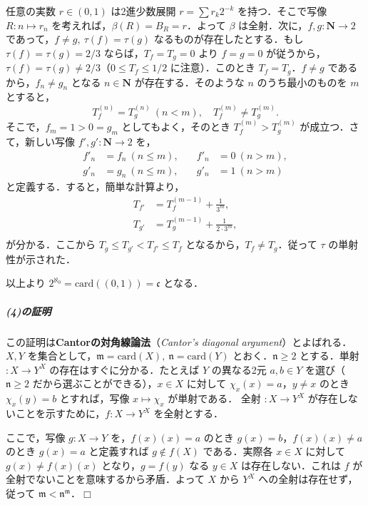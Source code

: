 \documentclass[10pt,b5paper,pandoc]{bxjsarticle}
\let\oldsubparagraph\subparagraph
\renewcommand{\subparagraph}[1]{\oldsubparagraph{#1}\mbox{}}
\def\lt{<}
\def\gt{>}
\begin{document}
任意の実数 \(r \in (0, 1)\) は2進少数展開 \(r = \sum r_k 2^{-k}\)
を持つ．そこで写像 \(R \colon n \mapsto r_n\)
を考えれば，\(\beta(R) = B_R = r\)．よって \(\beta\)
は全射．次に，\(f, g \colon \boldsymbol N \to 2\)
であって，\(f \neq g,\ \tau(f) = \tau(g)\)
なるものが存在したとする．もし \(\tau(f) = \tau(g) = 2/3\)
ならば，\(T_f = T_g = 0\) より \(f = g = 0\)
が従うから，\(\tau(f) = \tau(g) \neq 2/3\)（\(0 \leqslant T_f \leqslant 1/2\)
に注意）．このとき \(T_f = T_g\)．\(f \neq g\)
であるから，\(f_n \neq g_n\) となる \(n \in \boldsymbol N\)
が存在する．そのような \(n\) のうち最小のものを \(m\) とすると， \[
T_f^{(n)} = T_g^{(n)} \ (n \lt m), \quad T_f^{(m)} \neq T_g^{(m)}.
\] そこで，\(f_m = 1 \gt 0 = g_m\) としてもよく，そのとき
\(T_f^{(m)} \gt T_g^{(m)}\) が成立つ．さて，新しい写像
\(f', g' \colon \boldsymbol N \to 2\) を， \begin{align*}
f'_n &= f_n \ (n \leqslant m), &\quad f'_n &= 0 \ (n \gt m),\\
g'_n &= g_n \ (n \leqslant m), &\quad g'_n &= 1 \ (n \gt m)
\end{align*} と定義する．すると，簡単な計算より， \begin{align*}
T_{f'} &= T_f^{(m - 1)} + \frac 1{3^m},\\
T_{g'} &= T_g^{(m - 1)} + \frac 1{2 \cdot 3^m},\\
\end{align*} が分かる．ここから
\(T_g \leqslant T_{g'} \lt T_{f'} \leqslant T_f\)
となるから，\(T_f \neq T_g\)．従って \(\tau\) の単射性が示された．

以上より \(2^{\aleph_0} = \mathrm{card}((0, 1)) = \mathfrak c\) となる．

\hypertarget{ux306eux8a3cux660e-3}{%
\subparagraph{(4)の証明}\label{ux306eux8a3cux660e-3}}

この証明は\textbf{Cantorの対角線論法}（\emph{Cantor's diagonal
argument}）とよばれる．\(X, Y\)
を集合として，\(\mathfrak m = \mathrm{card}(X),\ \mathfrak n = \mathrm{card}(Y)\)
とおく．\(\mathfrak n \geqslant 2\) とする．単射 \(\colon X \to Y^X\)
の存在はすぐに分かる．たとえば \(Y\) の異なる2元 \(a, b \in Y\)
を選び（\(\mathfrak n \geqslant 2\)
だから選ぶことができる），\(x \in X\) に対して
\(\chi_x(x) = a\)，\(y \neq x\) のとき \(\chi_x(y) = b\) とすれば，写像
\(x \mapsto \chi_x\) が単射である． 全射 \(\colon X \to Y^X\)
が存在しないことを示すために，\(f \colon X \to Y^X\) を全射とする．

ここで，写像 \(g \colon X \to Y\) を，\(f(x)(x) = a\) のとき
\(g(x) = b\)，\(f(x)(x) \neq a\) のとき \(g(x) = a\) と定義すれば
\(g \notin f(X)\) である．実際各 \(x \in X\) に対して
\(g(x) \neq f(x)(x)\) となり，\(g = f(y)\) なる \(y \in X\)
は存在しない．これは \(f\) が全射でないことを意味するから矛盾．よって
\(X\) から \(Y^X\) への全射は存在せず，従って
\(\mathfrak m \lt \mathfrak n^{\mathfrak m}\)．\(\Box\)
\end{document}

